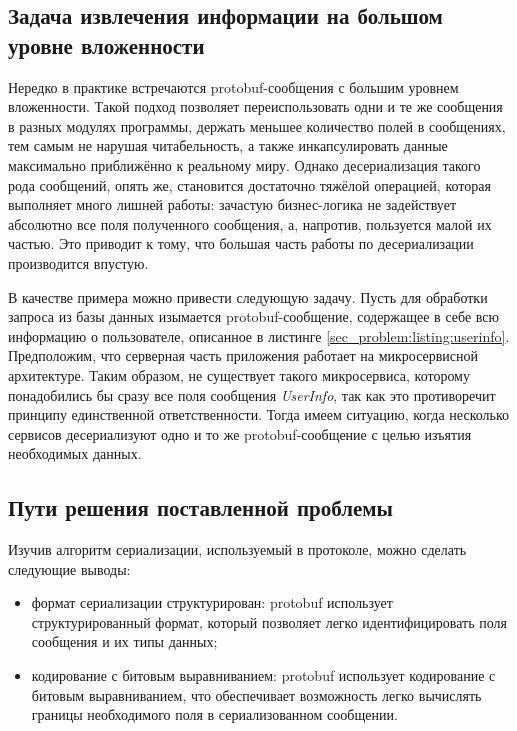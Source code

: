\subsection{Задача извлечения информации на большом уровне вложенности}
\label{sec_problem:sec:problem2}

Нередко в практике встречаются protobuf-сообщения с большим уровнем вложенности. Такой подход позволяет переиспользовать одни и те же сообщения в разных модулях
программы, держать меньшее количество полей в сообщениях, тем самым не нарушая читабельность, а также инкапсулировать данные максимально приближённо к реальному миру.
Однако десериализация такого рода сообщений, опять же, становится достаточно тяжёлой операцией, которая выполняет много лишней работы: зачастую бизнес-логика не задействует
абсолютно все поля полученного сообщения, а, напротив, пользуется малой их частью. Это приводит к тому, что большая часть работы по десериализации производится впустую.

В качестве примера можно привести следующую задачу. Пусть для обработки запроса из базы данных
изымается protobuf-сообщение, содержащее в себе всю информацию о пользователе, описанное в листинге \ref{sec_problem:listing:userinfo}.
Предположим, что серверная часть приложения работает на микросервисной архитектуре. Таким образом, не существует такого микросервиса,
которому понадобились бы сразу все поля сообщения \textit{UserInfo}, так как это противоречит принципу единственной ответственности.
Тогда имеем ситуацию, когда несколько сервисов десериализуют одно и то же protobuf-сообщение с целью изъятия необходимых данных.

\subsection{Пути решения поставленной проблемы}

Изучив алгоритм сериализации, используемый в протоколе, можно сделать следующие выводы:
\begin{itemize}
    \item формат сериализации структурирован: protobuf использует структурированный формат, который позволяет легко идентифицировать поля сообщения и их типы данных;
    \item кодирование с битовым выравниванием: protobuf использует кодирование с битовым выравниванием, что обеспечивает возможность легко вычислять границы необходимого поля в сериализованном сообщении.
\end{itemize}

